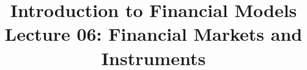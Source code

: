 \documentclass[10pt]{beamer}
\title{Introduction to Financial Models\\Lecture 06: Financial Markets and Instruments}
\author{}
\date{}
\begin{document}
\begin{frame}
\titlepage
\end{frame}


%  
%  
\end{document}
